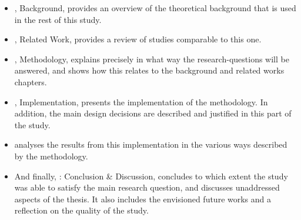 \begin{itemize}[ ]
  \item {}, Background, provides an overview of the theoretical background that is used in the rest of this study.
  
  \item {}, Related Work, provides a review of studies comparable to this one.

  \item {}, Methodology, explains precisely in what way the research-questions will be answered, and shows how this relates to the background and related works chapters. 

  \item {}, Implementation, presents the implementation of the methodology.
  In addition, the main design decisions are described and justified in this part of the study.
  
  \item {} analyses the results from this implementation in the various ways described by the methodology.
  
  \item And finally, : Conclusion \& Discussion, concludes to which extent the study was able to satisfy the main research question, and discusses unaddressed aspects of the thesis.
  It also includes the envisioned future works and a reflection on the quality of the study.

\end{itemize}
